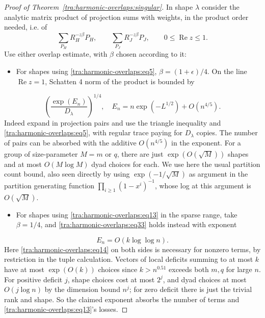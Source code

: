 \begin{proof}[Proof of Theorem~\ref{tra:harmonic-overlaps:singular}]
In shape \(\lambda\) consider the analytic matrix product of projection sums with weights, in the product order needed, i.e. of
\begin{equation}
                       \sum_{P_H} R_H^{-z\beta}P_H,\qquad
                       \sum_{P_J} R_J^{-z\beta}P_J,
             \qquad 0\le\operatorname{Re} z\le 1.                      \label{tra:harmonic-overlaps:eq32}
\end{equation}
Use either overlap estimate, with \(\beta\) chosen according to it:
\begin{itemize}
\item For shapes using \eqref{tra:harmonic-overlaps:eq5}, \(\beta=(1+\epsilon)/4\). On the line \(\operatorname{Re} z=1\), Schatten 4 norm of the product is bounded by
\end{itemize}
\begin{equation}
                         \left(\frac{\exp(E_n)}{D_\lambda}\right)^{1/4},
                    \quad E_n=n\exp(-L^{1/2})+ O(n^{4/5}).               \label{tra:harmonic-overlaps:eq33}
\end{equation}
Indeed expand in projection pairs and use the triangle inequality and \eqref{tra:harmonic-overlaps:eq5}, with regular trace paying for \(D_\lambda\) copies. The number of pairs can be absorbed with the additive \(O(n^{4/5})\) in the exponent. For a group of size-parameter \(M=m\) or \(q\), there are just \(\exp(O(\sqrt M))\) shapes and at most \(O(M\log M)\) dyad choices for each. We use here the usual partition count bound, also seen directly by using \(\exp(-1/\sqrt M)\) as argument in the partition generating function \(\prod_{i\ge 1}(1-x^i)^{-1}\), whose log at this argument is \(O(\sqrt M)\).
\begin{itemize}
\item For shapes using \eqref{tra:harmonic-overlaps:eq13} in the sparse range, take \(\beta=1/4\), and \eqref{tra:harmonic-overlaps:eq33} holds instead with exponent
\end{itemize}
\[
                                     E_n=O(k\log\log n).
\]
Here \eqref{tra:harmonic-overlaps:eq14} on both sides is necessary for nonzero terms, by restriction in the tuple calculation. Vectors of local deficits summing to at most \(k\) have at most \(\exp(O(k))\) choices since \(k>n^{0.51}\) exceeds both \(m,q\) for large \(n\). For positive deficit \(j\), shape choices cost at most \(2^j\), and dyad choices at most \(O(j\log n)\) by the dimension bound \(n^j\); for zero deficit there is just the trivial rank and shape. So the claimed exponent absorbs the number of terms and \eqref{tra:harmonic-overlaps:eq13}'s losses.


\end{proof}

